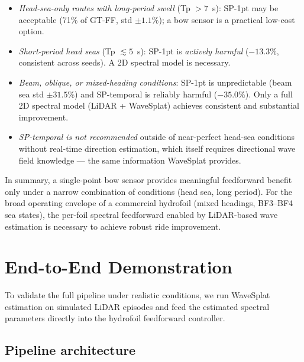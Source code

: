 \documentclass[review]{elsarticle}
\begin{document}
\begin{itemize}
  \item \emph{Head-sea-only routes with long-period swell} (Tp $> 7$~s):
    SP-1pt may be acceptable (71\% of GT-FF, std $\pm 1.1\%$); a bow
    sensor is a practical low-cost option.
  \item \emph{Short-period head seas} (Tp $\lesssim 5$~s):
    SP-1pt is \emph{actively harmful} ($-13.3\%$, consistent across seeds).
    A 2D spectral model is necessary.
  \item \emph{Beam, oblique, or mixed-heading conditions}:
    SP-1pt is unpredictable (beam sea std $\pm 31.5\%$) and SP-temporal
    is reliably harmful ($-35.0\%$).  Only a full 2D spectral model
    (LiDAR + WaveSplat) achieves consistent and substantial improvement.
  \item \emph{SP-temporal is not recommended} outside of near-perfect head-sea
    conditions without real-time direction estimation, which itself requires
    directional wave field knowledge — the same information WaveSplat provides.
\end{itemize}

In summary, a single-point bow sensor provides meaningful feedforward benefit
only under a narrow combination of conditions (head sea, long period).
For the broad operating envelope of a commercial hydrofoil (mixed headings,
BF3--BF4 sea states), the per-foil spectral feedforward enabled by
LiDAR-based wave estimation is necessary to achieve robust ride improvement.

\section{End-to-End Demonstration}
\label{sec:e2e}

To validate the full pipeline under realistic conditions, we run
WaveSplat estimation on simulated LiDAR episodes and feed the
estimated spectral parameters directly into the hydrofoil
feedforward controller.

\subsection{Pipeline architecture}
\end{document}
